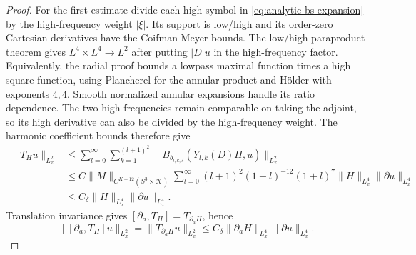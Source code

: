 \documentclass[11pt,a4paper]{article}
\numberwithin{equation}{section}
\theoremstyle{definition}
\begin{document}
\begin{proof}
For the first estimate divide each high symbol in
\eqref{eq:analytic-bs-expansion} by the high-frequency weight $|\xi|$. Its support is low/high
and its order-zero Cartesian derivatives have the Coifman-Meyer bounds.
The low/high paraproduct theorem gives $L^4\times L^4\to L^2$ after
putting $|D|u$ in the high-frequency factor. Equivalently, the radial proof bounds a
lowpass maximal function times a high square function, using Plancherel
for the annular product and H\"older with exponents $4,4$. Smooth normalized
annular expansions handle its ratio dependence. The two high frequencies
remain comparable on taking the adjoint, so its high derivative can also
be divided by the high-frequency weight. The harmonic coefficient bounds therefore give
\begin{equation*}
\begin{aligned}
\|T_Hu\|_{L^2_x}
&\leq\sum_{l=0}^\infty\sum_{k=1}^{(l+1)^2}
       \|B_{b_{l,k,\delta}}(Y_{l,k}(D)H,u)\|_{L^2_x}\\
&\leq C\|M\|_{C^{K+12}(S^3\times\mathcal K)}
       \sum_{l=0}^\infty(l+1)^2(1+l)^{-12}(1+l)^7
       \|H\|_{L^4_x}\|\partial u\|_{L^4_x}\\
&\leq C_\delta\|H\|_{L^4_x}\|\partial u\|_{L^4_x}.
\end{aligned}
\end{equation*}
Translation invariance gives $[\partial_a,T_H]=T_{\partial_aH}$, hence
\begin{equation*}
\|[\partial_a,T_H]u\|_{L^2_x}
=\|T_{\partial_aH}u\|_{L^2_x}
\leq C_\delta\|\partial_aH\|_{L^4_x}\|\partial u\|_{L^4_x}.
\end{equation*}


\end{proof}
\end{document}
